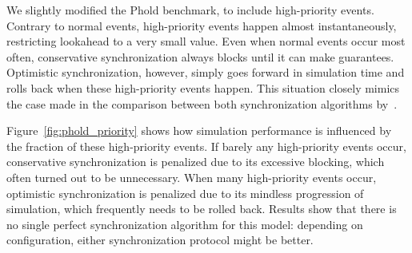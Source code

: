 We slightly modified the Phold benchmark, to include high-priority events.
Contrary to normal events, high-priority events happen almost instantaneously, restricting lookahead to a very small value.
Even when normal events occur most often, conservative synchronization always blocks until it can make guarantees.
Optimistic synchronization, however, simply goes forward in simulation time and rolls back when these high-priority events happen.
This situation closely mimics the case made in the comparison between both synchronization algorithms by~\cite{FujimotoBook}.

Figure~\ref{fig:phold_priority} shows how simulation performance is influenced by the fraction of these high-priority events.
If barely any high-priority events occur, conservative synchronization is penalized due to its excessive blocking, which often turned out to be unnecessary.
When many high-priority events occur, optimistic synchronization is penalized due to its mindless progression of simulation, which frequently needs to be rolled back.
Results show that there is no single perfect synchronization algorithm for this model: depending on configuration, either synchronization protocol might be better.
